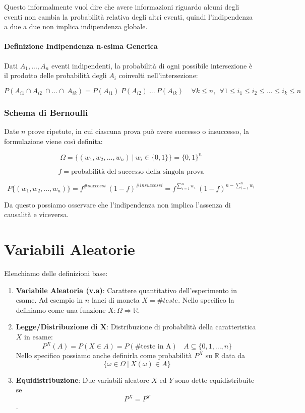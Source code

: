\documentclass{article}
\begin{document}
Questo informalmente vuol dire che avere informazioni riguardo alcuni degli eventi non cambia la probabilità relativa degli altri eventi, quindi l'indipendenza a due a due non implica indipendenza globale.

\paragraph{Definizione Indipendenza n-esima Generica} Dati $A_{1}, ..., A_{n}$ eventi indipendenti, la probabilità di ogni possibile intersezione è
il prodotto delle probabilità degli $A_{i}$ coinvolti nell'intersezione:

\vspace{-15px}

\[ P(A_{i1} \cap A_{i2} \: \cap ... \cap \: A_{ik}) = P(A_{i1}) \: P(A_{i2}) \: ... \: P(A_{ik}) \:\:\:\:\: \forall k \leq n, \:\: \forall 1 \leq i_{1} \leq i_{2} \leq ... \leq i_{k} \leq n  \]

\newpage

\subsubsection{Schema di Bernoulli}

Date $n$ prove ripetute, in cui ciascuna prova può avere successo o insuccesso, la formulazione viene così definita:

\[ \Omega = \{ (w_{1}, w_{2}, ..., w_{n}) \: | \: w_{i} \in \{0,1\} \} = \{0,1\}^{n} \]

\[ f = \text{probabilità del successo della singola prova} \]

\vspace{-15px}

\[ P\{ (w_{1}, w_{2}, ..., w_{n}) \} = f^{\#successi} \: (1-f)^{\#insuccessi} = f^{\sum_{i=1}^{n}w_{i}} \: (1-f)^{n - \sum_{i=1}^{n}w_{i}} \]

Da questo possiamo osservare che l'indipendenza non implica l'assenza di causalità e viceversa.

\section{Variabili Aleatorie}

Elenchiamo delle definizioni base:

\begin{enumerate}
    \item \textbf{Variabile Aleatoria (v.a)}: Carattere quantitativo dell'esperimento in esame. Ad esempio in $n$ lanci di moneta $X=\#teste$.
    Nello specifico la definiamo come una funzione $X:\Omega \Rightarrow \mathbb{R}$.
    \item \textbf{Legge/Distribuzione di X}: Distribuzione di probabilità della caratteristica $X$ in esame:
    \[ P^{X}(A) = P(X \in A) = P(\#\text{teste in A}) \:\:\:\: A \subseteq \{0,1, ...,n\} \]
    Nello specifico possiamo anche definirla come probabilità $P^{X}$ su $\mathbb{R}$ data da 
    \[ \{\omega \in \Omega \:|\: X(\omega) \in A\} \]
    \item \textbf{Equidistribuzione}: Due variabili aleatore $X$ ed $Y$ sono dette equidistribuite se \[P^{X} = P^{Y}\].
\end{enumerate}
\end{document}
